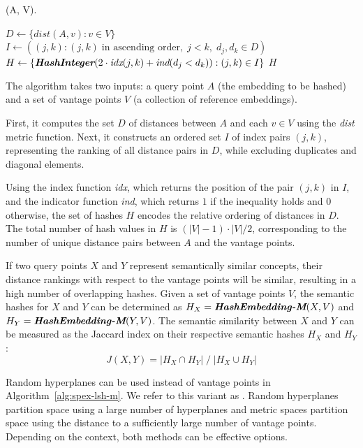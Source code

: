 \documentclass[sigconf, nonacm]{acmart}
\begin{document}
\begin{algorithm}
  \caption{(A, V).}
  \label{alg:spex-lsh-m}
  \begin{algorithmic}[1]
    \STATE $D \leftarrow \{ \textit{dist}(A, v) : v \in V\}$ %
    \STATE $I \leftarrow ((j, k): (j, k) \; \mbox{in ascending order}, \; j < k, \; d_j, d_k \in D)$
    \STATE $H \leftarrow \{ \textit{\textbf{HashInteger}}(2 \cdot \textit{idx}(j,k) + \textit{ind}(d_j < d_k)) : (j, k) \in I\}$
    \RETURN $H$
  \end{algorithmic}
\end{algorithm}

The  algorithm takes two inputs: a query point $A$ (the embedding to be hashed) and a set of vantage points $V$ (a collection of reference embeddings).

First, it computes the set $D$ of distances between $A$ and each $v \in V$ using the \textit{dist} metric function. Next, it constructs an ordered set $I$ of index pairs $(j, k)$, representing the ranking of all distance pairs in $D$, while excluding duplicates and diagonal elements.

Using the index function \textit{idx}, which returns the position of the pair $(j, k)$ in $I$, and the indicator function \textit{ind}, which returns $1$ if the inequality holds and $0$ otherwise, the set of hashes $H$ encodes the relative ordering of distances in $D$. The total number of hash values in $H$ is $(|V|-1)\cdot|V|/2$, corresponding to the number of unique distance pairs between $A$ and the vantage points.

If two query points $X$ and $Y$ represent semantically similar concepts, their distance rankings with respect to the vantage points will be similar, resulting in a high number of overlapping hashes. Given a set of vantage points $V$, the semantic hashes for $X$ and $Y$ can be determined as $H_X = \textit{\textbf{HashEmbedding-M}}(X, V)$ and $H_Y = \textit{\textbf{HashEmbedding-M}}(Y, V)$.
The semantic similarity between $X$ and $Y$ can be measured as the Jaccard index on their respective semantic hashes $H_X$ and $H_Y$:
\begin{equation}
  \label{eq:ssim}
  J(X,Y) =  |H_X \cap H_Y| \;/\; |H_X \cup H_Y|
\end{equation}

Random hyperplanes can be used instead of vantage points in
Algorithm~\ref{alg:spex-lsh-m}. We refer to this variant as .
Random hyperplanes partition space using a large number of hyperplanes and metric spaces partition space using the distance to a sufficiently large number of vantage points.
Depending on the context, both methods can be effective options.
\end{document}
